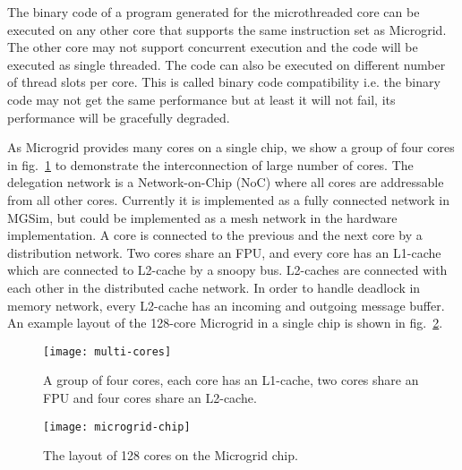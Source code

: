 \documentclass{article}
\begin{document}
The binary code of a program generated for the microthreaded core can be
executed on any other core that supports the same instruction set as Microgrid.
The other core may not support concurrent execution and the code will be
executed as single threaded. The code can also be executed on different number
of thread slots per core. This is called binary code compatibility i.e. the
binary code may not get the same performance but at least it will not fail, its
performance will be gracefully degraded.

As Microgrid provides many cores on a single chip, we show a group of four
cores in fig.~\ref{fig:multi_cores} to demonstrate the interconnection of large
number of cores. The delegation network is a Network-on-Chip (NoC) where all
cores are addressable from all other cores. Currently it is implemented as a
fully connected network in MGSim, but could be implemented as a mesh network in
the hardware implementation. A core is connected to the previous and the next
core by a distribution network. Two cores share an FPU, and every core has an
L1-cache which are connected to L2-cache by a snoopy bus. L2-caches are
connected with each other in the distributed cache network. In order to handle
deadlock in memory network, every L2-cache has an incoming and outgoing
message buffer. An example layout of the 128-core Microgrid in a
single chip is shown in fig.~\ref{fig:microgrids_chip}.

\begin{figure}

\begin{centering}

\texttt{[image: multi-cores]}

\caption{\label{fig:multi_cores}A group of four cores, each core has an
L1-cache, two cores share an FPU and four cores share an L2-cache.}

\end{centering}

\end{figure}


\begin{figure}

\begin{centering}

\texttt{[image: microgrid-chip]}
    
\caption{\label{fig:microgrids_chip}The layout of 128 cores on the Microgrid
chip.}

\end{centering}

\end{figure}
\end{document}
